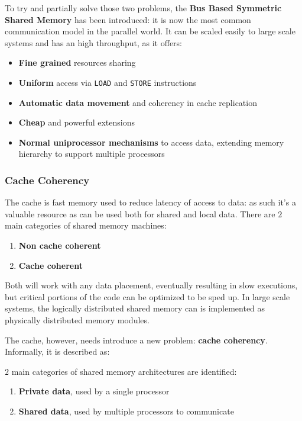 \documentclass[english]{article}
\begin{document}
To try and partially solve those two problems, the \textbf{Bus Based Symmetric Shared Memory} has been introduced:
it is now the most common communication model in the parallel world.
It can be scaled easily to large scale systems and has an high throughput, as it offers:

\begin{itemize}
  \item \textbf{Fine grained} resources sharing
  \item \textbf{Uniform} access via \texttt{LOAD} and \texttt{STORE} instructions
  \item \textbf{Automatic data movement} and coherency in cache replication
  \item \textbf{Cheap} and powerful extensions
  \item \textbf{Normal uniprocessor mechanisms} to access data, extending memory hierarchy to support multiple processors
\end{itemize}

\subsubsection{Cache Coherency}

The cache is fast memory used to reduce latency of access to data:
as such it's a valuable resource as can be used both for shared and local data.
There are \(2\) main categories of shared memory machines:

\begin{enumerate}
  \item \textbf{Non cache coherent}
  \item \textbf{Cache coherent}
\end{enumerate}

Both will work with any data placement, eventually resulting in slow executions, but critical portions of the code can be optimized to be sped up.
In large scale systems, the logically distributed shared memory can is implemented as physically distributed memory modules.

The cache, however, needs introduce a new problem: \textbf{cache coherency}.
Informally, it is described as:


\(2\) main categories of shared memory architectures are identified:

\begin{enumerate}
  \item \textbf{Private data}, used by a single processor
  \item \textbf{Shared data}, used by multiple processors to communicate
\end{enumerate}
\end{document}
